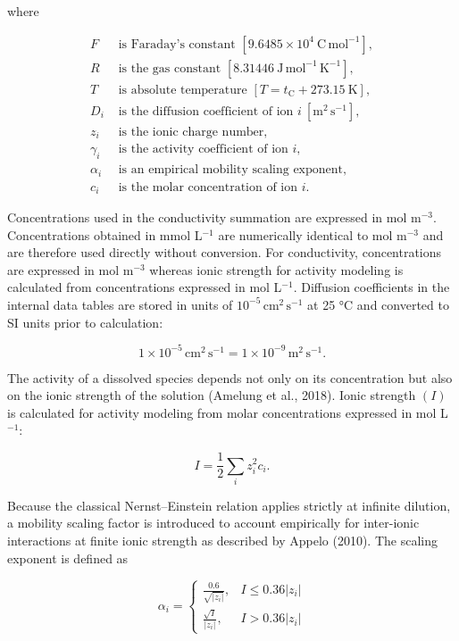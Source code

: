 \documentclass[
  letterpaper,
  DIV=11,
  numbers=noendperiod]{scrreprt}
\begin{document}
\noindent where

\begin{align*}
F &\text{ is Faraday’s constant } [9.6485\times 10^{4}\ \mathrm{C\,mol^{-1}}],\\
R &\text{ is the gas constant } [8.31446\ \mathrm{J\,mol^{-1}\,K^{-1}}],\\
T &\text{ is absolute temperature } [T = t_{\mathrm{C}} + 273.15\ \mathrm{K}],\\
D_i &\text{ is the diffusion coefficient of ion } i\ [\mathrm{m^2\,s^{-1}}],\\
z_i &\text{ is the ionic charge number},\\
\gamma_i &\text{ is the activity coefficient of ion } i,\\
\alpha_i &\text{ is an empirical mobility scaling exponent},\\
c_i &\text{ is the molar concentration of ion } i.
\end{align*}

Concentrations used in the conductivity summation are expressed in mol
m\(^{-3}\). Concentrations obtained in mmol L\(^{-1}\) are numerically
identical to mol m\(^{-3}\) and are therefore used directly without
conversion. For conductivity, concentrations are expressed in mol
m\(^{-3}\) whereas ionic strength for activity modeling is calculated
from concentrations expressed in mol L\(^{-1}\). Diffusion coefficients
in the internal data tables are stored in units of
\(10^{-5}\,\mathrm{cm^2\,s^{-1}}\) at 25 °C and converted to SI units
prior to calculation:

\[
1\times10^{-5}\,\mathrm{cm^2\,s^{-1}}
=
1\times10^{-9}\,\mathrm{m^2\,s^{-1}}.
\]

The activity of a dissolved species depends not only on its
concentration but also on the ionic strength of the solution (Amelung et
al., 2018). Ionic strength \((I)\) is calculated for activity modeling
from molar concentrations expressed in mol L\(^{-1}\):

\[
I
=
\frac{1}{2}\sum_i z_i^2 c_i.
\]

Because the classical Nernst--Einstein relation applies strictly at
infinite dilution, a mobility scaling factor is introduced to account
empirically for inter-ionic interactions at finite ionic strength as
described by Appelo (2010). The scaling exponent is defined as

\[
\alpha_i
=
\begin{cases}
\frac{0.6}{\sqrt{|z_i|}}, & I \le 0.36|z_i| \\
\frac{\sqrt{I}}{|z_i|}, & I > 0.36|z_i|
\end{cases}
\]
\end{document}
